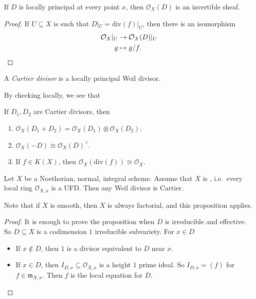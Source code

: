 \documentclass[a4paper]{article}
\renewcommand\div{\mathrm{div}}
\begin{document}
\begin{prop}
  If $D$ is locally principal at every point $x$, then $\mathcal{O}_X(D)$ is an invertible sheaf.
\end{prop}
\begin{proof}
  If $U \subseteq X$ is such that $D|_U = \div(f)|_U$, then there is an isomorphism
  \begin{align*}
    \mathcal{O}_X|_U &\to \mathcal{O}_X(D) |_U\\
    g &\mapsto g/f.\qedhere
  \end{align*}
\end{proof}
\begin{defi}
  A \emph{Cartier divisor} is a locally principal Weil divisor.
\end{defi}

By checking locally, we see that
\begin{prop}
  If $D_1, D_2$ are Cartier divisors, then
  \begin{enumerate}
    \item $\mathcal{O}_X(D_1 + D_2) = \mathcal{O}_X(D_1) \otimes \mathcal{O}_X(D_2)$.
    \item $\mathcal{O}_X(-D) \cong \mathcal{O}_X(D)^{\vee}$.
    \item If $f \in K(X)$, then $\mathcal{O}_X(\div(f)) \cong \mathcal{O}_X$.\fakeqed
  \end{enumerate}
\end{prop}

\begin{prop}
  Let $X$ be a Noetherian, normal, integral scheme. Assume that $X$ is , i.e.\ every local ring $\mathcal{O}_{X, x}$ is a UFD. Then any Weil divisor is Cartier.
\end{prop}
Note that if $X$ is smooth, then $X$ is always factorial, and this proposition applies.

\begin{proof}
  It is enough to prove the proposition when $D$ is irreducible and effective. So $D \subseteq X$ is a codimension $1$ irreducible subvariety. For $x \in D$
  \begin{itemize}
    \item If $x \not \in D$, then $1$ is a divisor equivalent to $D$ near $x$.
    \item If $x \in D$, then $I_{D, x} \subseteq \mathcal{O}_{X, x}$ is a height $1$ prime ideal. So $I_{D, x} = (f)$ for $f \in \mathfrak{m}_{X, x}$. Then $f$ is the local equation for $D$.\qedhere
  \end{itemize}
\end{proof}
\end{document}
